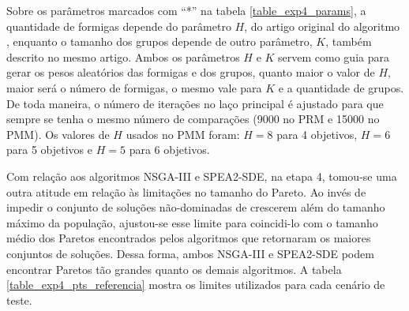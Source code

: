 Sobre os parâmetros marcados com ``*'' na tabela \ref{table_exp4_params}, a quantidade de formigas depende do parâmetro $H$, do artigo original do algoritmo \cite{Ke2013}, enquanto o tamanho dos grupos depende de outro parâmetro, $K$, também descrito no mesmo artigo. Ambos os parâmetros $H$ e $K$ servem como guia para gerar os pesos aleatórios das formigas e dos grupos, quanto maior o valor de $H$, maior será o número de formigas, o mesmo vale para $K$ e a quantidade de grupos. De toda maneira, o número de iterações no laço principal é ajustado para que sempre se tenha o mesmo número de comparações (9000 no PRM e 15000 no PMM). Os valores de $H$ usados no PMM foram: $H=8$ para 4 objetivos, $H=6$ para 5 objetivos e $H=5$ para 6 objetivos.

Com relação aos algoritmos NSGA-III e SPEA2-SDE, na etapa 4, tomou-se uma outra atitude em relação às limitações no tamanho do Pareto. Ao invés de impedir o conjunto de soluções não-dominadas de crescerem além do tamanho máximo da população, ajustou-se esse limite para coincidi-lo com o tamanho médio dos Paretos encontrados pelos algoritmos que retornaram os maiores conjuntos de soluções. Dessa forma, ambos NSGA-III e SPEA2-SDE podem encontrar Paretos tão grandes quanto os demais algoritmos. A tabela \ref{table_exp4_pts_referencia} mostra os limites utilizados para cada cenário de teste.

